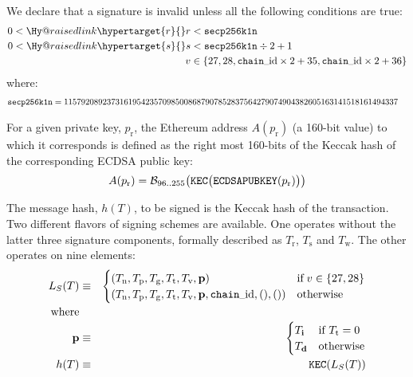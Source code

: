 \documentclass[9pt,oneside]{amsart}
\makeatletter
\newcommand{\linkdest}[1]{\Hy@raisedlink{\hypertarget{#1}{}}}
\makeatother
\begin{document}
\newcommand{\slimit}{\ensuremath{\text{s-limit}}}

We declare that a signature is invalid unless all the following conditions are true:
\begin{align}
0 < \linkdest{r}{r} &< \mathtt{\tiny secp256k1n} \\
0 < \linkdest{s}{s} &< \mathtt{\tiny secp256k1n} \div 2 + 1 \\
v &\in \{27,28,\mathtt{\tiny chain\_{\mathrm{id}}} \times 2 + 35, \mathtt{\tiny chain\_{\mathrm{id}}} \times 2 + 36\}
\end{align}
where:
\begin{align}
\mathtt{\tiny secp256k1n} &= 115792089237316195423570985008687907852837564279074904382605163141518161494337
\end{align}

For a given private key, $p_{\mathrm{r}}$, the Ethereum address $A(p_{\mathrm{r}})$ (a 160-bit value) to which it corresponds is defined as the right most 160-bits of the Keccak hash of the corresponding ECDSA public key:
\begin{equation}
A(p_{\mathrm{r}}) = \mathcal{B}_{96..255}\big(\mathtt{\tiny KEC}\big( \mathtt{\small ECDSAPUBKEY}(p_{\mathrm{r}}) \big) \big)
\end{equation}

\hypertarget{h T}{}The message hash, $h(T)$, to be signed is the Keccak hash of the transaction. Two different flavors of signing schemes are available. One operates without the latter three signature components, formally described as $T_{\mathrm{r}}$, $T_{\mathrm{s}}$ and $T_{\mathrm{w}}$. The other operates on nine elements:
\begin{eqnarray}
L_{S}(T) & \equiv & \begin{cases}
(T_{\mathrm{n}}, T_{\mathrm{p}}, T_{\mathrm{g}}, T_{\mathrm{t}}, T_{\mathrm{v}}, \mathbf{p}) & \text{if} \; v \in \{27, 28\} \\
(T_{\mathrm{n}}, T_{\mathrm{p}}, T_{\mathrm{g}}, T_{\mathrm{t}}, T_{\mathrm{v}}, \mathbf{p}, \mathtt{\tiny chain\_{\mathrm{id}}}, (), ()) & \text{otherwise} \\
\end{cases} \\
\nonumber \text{where} \\
\nonumber \mathbf{p} & \equiv & \begin{cases}
T_{\mathbf{i}} & \text{if}\ T_{\mathrm{t}} = 0 \\
T_{\mathbf{d}} & \text{otherwise}
\end{cases} \\
h(T) & \equiv & \mathtt{\small KEC}( L_{S}(T) )
\end{eqnarray}
\end{document}
